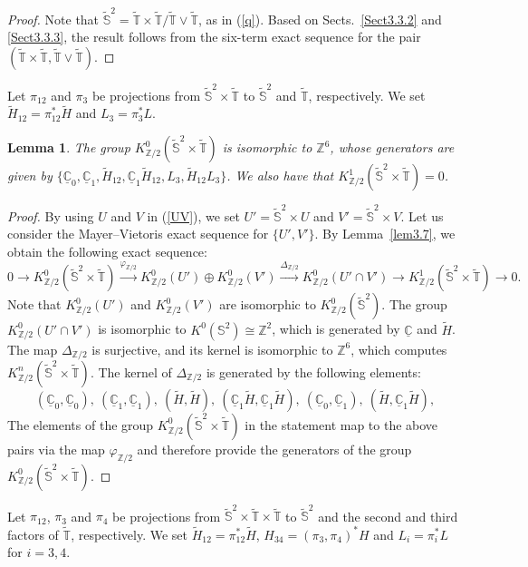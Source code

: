 \documentclass{amsart}
\theoremstyle{plain}
\newtheorem{lemma}[theorem]{Lemma}
\theoremstyle{definition}
\theoremstyle{remark}
\newcommand{\Z}{\mathbb{Z}}
\newcommand{\C}{\mathbb{C}}
\newcommand{\T}{\mathbb{T}}
\newcommand{\SSS}{\mathbb{S}}
\newcommand{\tT}{\widetilde{\T}}
\newcommand{\tS}{\widetilde{\SSS}}
\newcommand{\tH}{\widetilde{H}}
\newcommand{\uC}{\underline{\C}}
\begin{document}
\begin{proof}
Note that $\tS^2 = \tT \times \tT / \tT \vee \tT$, as in (\ref{q}).
Based on Sects.~\ref{Sect3.3.2} and \ref{Sect3.3.3}, the result follows from the six-term exact sequence for the pair $(\tT \times \tT, \tT \vee \tT)$.
\end{proof}

Let $\pi_{12}$ and $\pi_3$ be projections from $\tS^2 \times \tT$ to $\tS^2$ and $\tT$, respectively.
We set $\tH_{12} = \pi_{12}^* \tH$ and $L_3 = \pi_3^* L$.

\begin{lemma}
\label{lem3.8}
The group $K^0_{\Z/2}(\tS^2 \times \tT)$ is isomorphic to $\Z^6$, whose generators are given by $\{ \uC_0, \uC_1, \tH_{12}, \uC_1 \tH_{12}, L_3, \tH_{12} L_3 \}$.
We also have that $K^1_{\Z/2}(\tS^2 \times \tT) =0$.
\end{lemma}

\begin{proof}
By using $U$ and $V$ in (\ref{UV}), we set $U' = \tS^2 \times U$ and $V' = \tS^2 \times V$.
Let us consider the Mayer--Vietoris exact sequence for $\{ U', V' \}$.
By Lemma~\ref{lem3.7}, we obtain the following exact sequence:
\begin{equation*}
	0 \to K^0_{\Z/2}(\tS^2 \times \tT) \overset{\varphi_{\Z/2}}{\longrightarrow} K^0_{\Z/2}(U') \oplus K^0_{\Z/2}(V') \overset{\Delta_{\Z/2}}{\longrightarrow} K^0_{\Z/2}(U' \cap V') \to K^1_{\Z/2}(\tS^2 \times \tT) \to 0.
\end{equation*}
Note that $K^0_{\Z/2}(U')$ and $K^0_{\Z/2}(V')$ are isomorphic to $K^0_{\Z/2}(\tS^2)$.
The group $K^0_{\Z/2}(U' \cap V')$ is isomorphic to $K^0(\SSS^2) \cong \Z^2$, which is generated by $\uC$ and $\tH$.
The map $\Delta_{\Z/2}$ is surjective, and its kernel is isomorphic to $\Z^6$, which computes $K^n_{\Z/2}(\tS^2 \times \tT)$.
The kernel of $\Delta_{\Z/2}$ is generated by the following elements:
\begin{equation*}
	(\uC_0, \uC_0), \ (\uC_1, \uC_1), \ (\tH, \tH), \ (\uC_1 \tH, \uC_1 \tH), \ (\uC_0, \uC_1), \ (\tH, \uC_1 \tH),
\end{equation*}
The elements of the group $K^0_{\Z/2}(\tS^2 \times \tT)$ in the statement map to the above pairs via the map $\varphi_{\Z/2}$ and therefore provide the generators of the group $K^0_{\Z/2}(\tS^2 \times \tT)$.
\end{proof}

Let $\pi_{12}$, $\pi_3$ and $\pi_4$ be projections from $\tS^2 \times \tT \times \tT$ to $\tS^2$ and the second and third factors of $\tT$, respectively.
We set $\tH_{12} = \pi_{12}^* \tH$, $H_{34} = (\pi_3, \pi_4)^*H$ and $L_i = \pi_i^* L$ for $i=3,4$.
\end{document}
